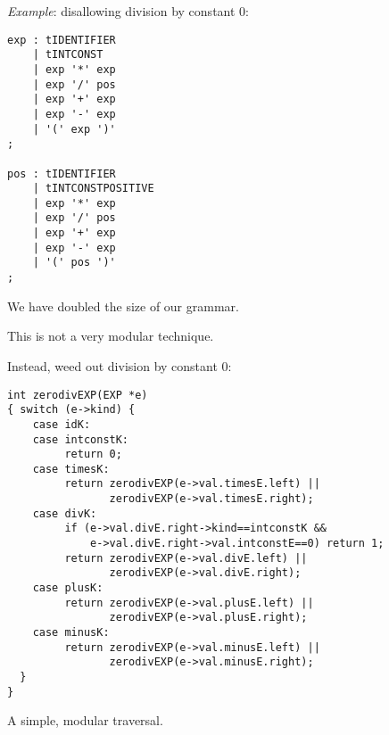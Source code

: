 \begin{slide*}
{\em Example}: disallowing division by constant 0:
 
\begin{scriptsize}
\begin{verbatim}
exp : tIDENTIFIER 
    | tINTCONST
    | exp '*' exp
    | exp '/' pos
    | exp '+' exp
    | exp '-' exp
    | '(' exp ')'
;

pos : tIDENTIFIER    
    | tINTCONSTPOSITIVE
    | exp '*' exp
    | exp '/' pos
    | exp '+' exp
    | exp '-' exp
    | '(' pos ')'
;
\end{verbatim}
\end{scriptsize}

We have doubled the size of our grammar.

This is not a very modular technique.
\vfil
\end{slide*}
 
\begin{slide*}
Instead, weed out division by constant 0:
 
\begin{scriptsize}
\begin{verbatim}
int zerodivEXP(EXP *e)
{ switch (e->kind) {
    case idK: 
    case intconstK:
         return 0;
    case timesK:
         return zerodivEXP(e->val.timesE.left) || 
                zerodivEXP(e->val.timesE.right);
    case divK:
         if (e->val.divE.right->kind==intconstK &&
             e->val.divE.right->val.intconstE==0) return 1;
         return zerodivEXP(e->val.divE.left) || 
                zerodivEXP(e->val.divE.right);
    case plusK:
         return zerodivEXP(e->val.plusE.left) || 
                zerodivEXP(e->val.plusE.right);
    case minusK:
         return zerodivEXP(e->val.minusE.left) || 
                zerodivEXP(e->val.minusE.right);
  }
}
\end{verbatim}
\end{scriptsize}

A simple, modular traversal.
\vfil
\end{slide*}
 
